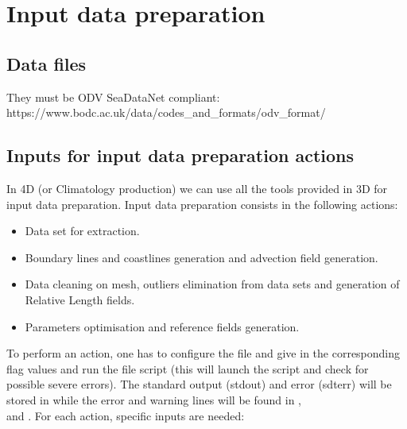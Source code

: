 \section{Input data preparation}

\subsection{Data files}

They must be ODV SeaDataNet compliant: https://www.bodc.ac.uk/data/codes\_and\_formats/odv\_format/


\subsection{Inputs for input data preparation actions}

In \diva 4D (or Climatology production) we can use all the tools provided in \diva 3D for input data preparation.
Input data preparation consists in the following actions:

\vspace{-0.5cm}

\begin{itemize}
\item Data set for extraction.
\item Boundary lines and coastlines generation and advection field generation.
\item Data cleaning on mesh, outliers elimination from data sets and generation of Relative Length fields.
\item Parameters optimisation and reference fields generation.
\end{itemize}


To perform an action, one has to configure the  file and give in the corresponding flag values and run the
 file script (this will launch the  script and check for possible severe errors). 
The standard output (stdout) and error (sdterr) will be stored in  while the error and warning lines will be found in 
, \\  and .
For each action, specific inputs are needed:



